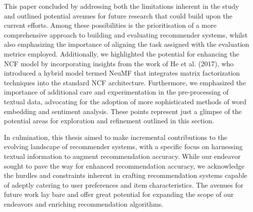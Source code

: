 This paper concluded by addressing both the limitations inherent in the study and outlined potential avenues for future research that could build upon the current efforts. Among these possibilities is the prioritisation of a more comprehensive approach to building and evaluating recommender systems, whilst also emphasizing the importance of aligning the task assigned with the evaluation metrics employed. Additionally, we highlighted the potential for enhancing the NCF model by incorporating insights from the work of He et al. (2017), who introduced a hybrid model termed NeuMF that integrates matrix factorization techniques into the standard NCF architecture. Furthermore, we emphasized the importance of additional care and experimentation in the pre-processing of textual data, advocating for the adoption of more sophisticated methods of word embedding and sentiment analysis. These points represent just a glimpse of the potential areas for exploration and refinement outlined in this section.

In culmination, this thesis aimed to make incremental contributions to the evolving landscape of recommender systems, with a specific focus on harnessing textual information to augment recommendation accuracy. While our endeavor sought to pave the way for enhanced recommendation accuracy, we acknowledge the hurdles and constraints inherent in crafting recommendation systems capable of adeptly catering to user preferences and item characteristics. The avenues for future work lay bare and offer great potential for expanding the scope of our endeavors and enriching recommendation algorithms.
